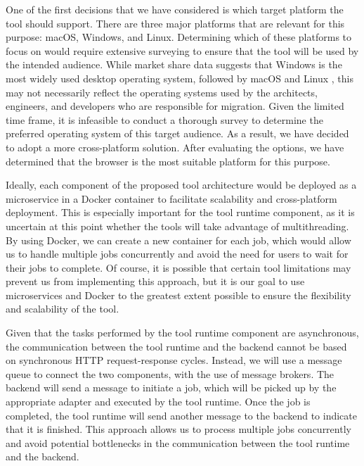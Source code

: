 One of the first decisions that we have considered is which target platform the
tool should support. There are three major platforms that are relevant for this
purpose: macOS, Windows, and Linux. Determining which of these platforms to
focus on would require extensive surveying to ensure that the tool will be used
by the intended audience. While market share data suggests that Windows is the
most widely used desktop operating system, followed by macOS and Linux
\cite{desktop-usage-worldwide}, this may not necessarily reflect the operating
systems used by the architects, engineers, and developers who are responsible
for migration. Given the limited time frame, it is infeasible to conduct a
thorough survey to determine the preferred operating system of this target
audience. As a result, we have decided to adopt a more cross-platform solution.
After evaluating the options, we have determined that the browser is the most
suitable platform for this purpose.

Ideally, each component of the proposed tool architecture would be deployed as
a microservice in a Docker container to facilitate scalability and
cross-platform deployment. This is especially important for the tool runtime
component, as it is uncertain at this point whether the tools will take
advantage of multithreading. By using Docker, we can create a new container for
each job, which would allow us to handle multiple jobs concurrently and avoid
the need for users to wait for their jobs to complete. Of course, it is
possible that certain tool limitations may prevent us from implementing this
approach, but it is our goal to use microservices and Docker to the greatest
extent possible to ensure the flexibility and scalability of the tool.

Given that the tasks performed by the tool runtime component are asynchronous,
the communication between the tool runtime and the backend cannot be based on
synchronous HTTP request-response cycles. Instead, we will use a message queue
to connect the two components, with the use of message brokers. The backend
will send a message to initiate a job, which will be picked up by the
appropriate adapter and executed by the tool runtime. Once the job is
completed, the tool runtime will send another message to the backend to
indicate that it is finished. This approach allows us to process multiple jobs
concurrently and avoid potential bottlenecks in the communication between the
tool runtime and the backend.

